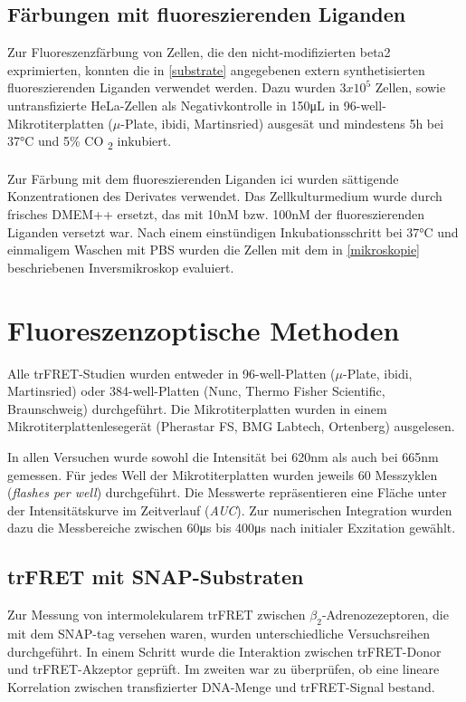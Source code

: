 \subsection{Färbungen mit fluoreszierenden Liganden}
Zur Fluoreszenzfärbung von Zellen, die den nicht-modifizierten \gls{beta2} exprimierten, konnten die in \ref{substrate} angegebenen extern synthetisierten fluoreszierenden Liganden verwendet werden. Dazu wurden $3x10^5$ Zellen, sowie untransfizierte HeLa-Zellen als Negativkontrolle in 150\si{\micro\liter} in 96-well-Mikrotiterplatten ($\mu$-Plate, ibidi, Martinsried) ausgesät und mindestens 5\si{\hour} bei 37\si{\celsius} und 5\% CO \textsubscript{2} inkubiert.
\\ \\
Zur Färbung mit dem fluoreszierenden Liganden \gls{ici} wurden sättigende Konzentrationen des Derivates verwendet. Das Zellkulturmedium wurde durch frisches DMEM++ ersetzt, das mit 10\si{\nano M} bzw. 100\si{\nano M} der fluoreszierenden Liganden versetzt war. Nach einem einstündigen Inkubationsschritt bei 37\si{\celsius} und einmaligem Waschen mit PBS wurden die Zellen mit dem in \ref{mikroskopie} beschriebenen Inversmikroskop evaluiert.

\section{Fluoreszenzoptische Methoden}
\label{reader}
Alle trFRET-Studien wurden entweder in 96-well-Platten ($\mu$-Plate, ibidi, Martinsried) oder 384-well-Platten (Nunc, Thermo Fisher Scientific, Braunschweig) durchgeführt. Die Mikrotiterplatten wurden in einem Mikrotiterplattenlesegerät (Pherastar FS, BMG Labtech, Ortenberg) ausgelesen. 

In allen Versuchen wurde sowohl die Intensität bei 620\si{\nano\meter} als auch bei 665\si{\nano\meter} gemessen. Für jedes Well der Mikrotiterplatten wurden jeweils 60 Messzyklen (\textit{flashes per well}) durchgeführt. Die Messwerte repräsentieren eine Fläche unter der Intensitätskurve im Zeitverlauf (\textit{AUC}). Zur numerischen Integration wurden dazu die Messbereiche zwischen 60\si{\micro\second} bis 400\si{\micro\second} nach initialer Exzitation gewählt. 

\subsection{trFRET mit SNAP-Substraten}
Zur Messung von intermolekularem trFRET zwischen $\beta_2$-Adrenozezeptoren, die mit dem SNAP-tag versehen waren, wurden unterschiedliche Versuchsreihen durchgeführt. In einem Schritt wurde die Interaktion zwischen trFRET-Donor und trFRET-Akzeptor geprüft. Im zweiten war zu überprüfen, ob eine lineare Korrelation zwischen transfizierter DNA-Menge und trFRET-Signal bestand.

